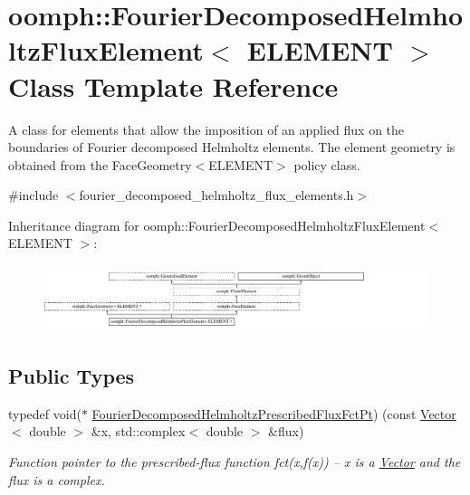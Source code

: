 \hypertarget{classoomph_1_1FourierDecomposedHelmholtzFluxElement}{}\section{oomph\+:\+:Fourier\+Decomposed\+Helmholtz\+Flux\+Element$<$ E\+L\+E\+M\+E\+NT $>$ Class Template Reference}
\label{classoomph_1_1FourierDecomposedHelmholtzFluxElement}


A class for elements that allow the imposition of an applied flux on the boundaries of Fourier decomposed Helmholtz elements. The element geometry is obtained from the Face\+Geometry$<$\+E\+L\+E\+M\+E\+N\+T$>$ policy class.  




{\ttfamily \#include $<$fourier\+\_\+decomposed\+\_\+helmholtz\+\_\+flux\+\_\+elements.\+h$>$}

Inheritance diagram for oomph\+:\+:Fourier\+Decomposed\+Helmholtz\+Flux\+Element$<$ E\+L\+E\+M\+E\+NT $>$\+:\begin{figure}[H]
\begin{center}
\leavevmode
\includegraphics[height=1.954625cm]{classoomph_1_1FourierDecomposedHelmholtzFluxElement}
\end{center}
\end{figure}
\subsection*{Public Types}
\begin{DoxyCompactItemize}
\item 
typedef void($\ast$ \hyperlink{classoomph_1_1FourierDecomposedHelmholtzFluxElement_af230a2a3a16a1fd0a48a2681dc94c1e8}{Fourier\+Decomposed\+Helmholtz\+Prescribed\+Flux\+Fct\+Pt}) (const \hyperlink{classoomph_1_1Vector}{Vector}$<$ double $>$ \&x, std\+::complex$<$ double $>$ \&flux)
\begin{DoxyCompactList}\small\item\em Function pointer to the prescribed-\/flux function fct(x,f(x)) -- x is a \hyperlink{classoomph_1_1Vector}{Vector} and the flux is a complex. \end{DoxyCompactList}\end{DoxyCompactItemize}
